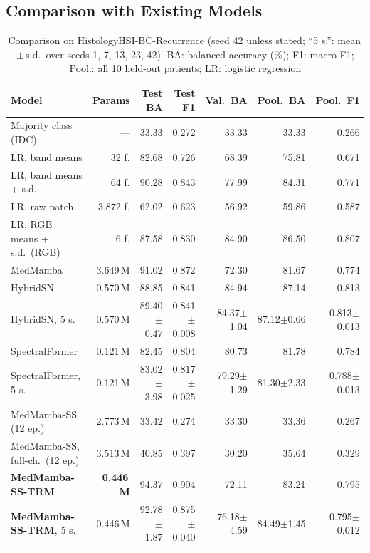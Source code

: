 \documentclass{svproc}
\newcommand{\pt}{\ensuremath{\pm}}       %
\newcommand{\sd}[1]{{\tiny\ensuremath{\pm}#1}}  %
\begin{document}
\subsection{Comparison with Existing Models}\label{sec:comparison}

\begin{table}[t]
\caption{Comparison on HistologyHSI-BC-Recurrence (seed 42 unless stated; ``5 s.'': mean\,\pt\,s.d.\ over seeds 1, 7, 13, 23, 42). BA: balanced accuracy (\%); F1: macro-F1; Pool.: all 10 held-out patients; LR: logistic regression}
\label{tab:main}
\centering\scriptsize
\setlength{\tabcolsep}{1.5pt}
\begin{tabular}{@{}lrrrrrr@{}}
\toprule
Model & Params & Test BA & Test F1 & Val.\ BA & Pool.\ BA & Pool.\ F1 \\
\midrule
Majority class (IDC) & --- & 33.33 & 0.272 & 33.33 & 33.33 & 0.266 \\
LR, band means & 32 f. & 82.68 & 0.726 & 68.39 & 75.81 & 0.671 \\
LR, band means + s.d. & 64 f. & 90.28 & 0.843 & 77.99 & 84.31 & 0.771 \\
LR, raw patch & 3,872 f. & 62.02 & 0.623 & 56.92 & 59.86 & 0.587 \\
LR, RGB means + s.d.\ (RGB) & 6 f. & 87.58 & 0.830 & 84.90 & 86.50 & 0.807 \\
MedMamba~\cite{medmamba} & 3.649\,M & 91.02 & 0.872 & 72.30 & 81.67 & 0.774 \\
HybridSN~\cite{hybridsn} & 0.570\,M & 88.85 & 0.841 & 84.94 & 87.14 & 0.813 \\
HybridSN, 5 s. & 0.570\,M & 89.40\sd{0.47} & 0.841\sd{0.008} & 84.37\sd{1.04} & 87.12\sd{0.66} & 0.813\sd{0.013} \\
SpectralFormer~\cite{spectralformer} & 0.121\,M & 82.45 & 0.804 & 80.73 & 81.78 & 0.784 \\
SpectralFormer, 5 s. & 0.121\,M & 83.02\sd{3.98} & 0.817\sd{0.025} & 79.29\sd{1.29} & 81.30\sd{2.33} & 0.788\sd{0.013} \\
MedMamba-SS (12 ep.) & 2.773\,M & 33.42 & 0.274 & 33.30 & 33.36 & 0.267 \\
MedMamba-SS, full-ch.\ (12 ep.) & 3.513\,M & 40.85 & 0.397 & 30.20 & 35.64 & 0.329 \\
\textbf{MedMamba-SS-TRM} & \textbf{0.446\,M} & 94.37 & 0.904 & 72.11 & 83.21 & 0.795 \\
\textbf{MedMamba-SS-TRM}, 5 s. & 0.446\,M & 92.78\sd{1.87} & 0.875\sd{0.040} & 76.18\sd{4.59} & 84.49\sd{1.45} & 0.795\sd{0.012} \\
\bottomrule
\end{tabular}
\end{table}
\end{document}
